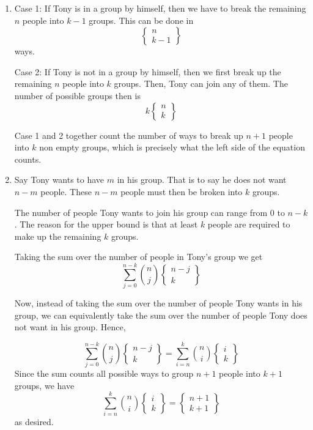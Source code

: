 \begin{enumerate}[label=(\alph*)]
\item Case 1: If Tony is in a group by himself, then we have to break the 
remaining $n$ people into $k-1$ groups. This can be done in 
  $$
  \left\{
    \begin{array}{cc}
        n\\
        k-1
    \end{array}
  \right\}
  $$
  ways.
  
  Case 2: If Tony is not in a group by himself, then we first break up the 
  remaining $n$ people into $k$ groups. Then, Tony can join any of them. 
  The number of possible groups then is
  $$
  k\left\{
    \begin{array}{cc}
        n\\
        k
    \end{array}
  \right\}
  $$
  
  Case 1 and 2 together count the number of ways to break up $n+1$ people into 
  $k$ non empty groups, which is precisely what the left side of the equation counts.

\item   Say Tony wants to have $m$ in his group. That is to say he does not want 
$n-m$ people. These $n-m$ people must then be broken into $k$ groups. 
  
  The number of people Tony wants to join his group can range from $0$ to $n-k$. 
  The reason for the upper bound is that at least $k$ people are required to 
  make up the remaining $k$ groups.
  
  Taking the sum over the number of people in Tony's group we get
  $$\sum_{j=0}^{n-k}{n \choose j}\left\{
    \begin{array}{cc}
        n-j\\
        k
    \end{array}
  \right\}
  $$
  
  Now, instead of taking the sum over the number of people Tony wants in his 
  group, we can equivalently take the sum over the number of people Tony does 
  not want in his group. Hence,
  
  $$\sum_{j=0}^{n-k}{n \choose j}\left\{
      \begin{array}{cc}
          n-j\\
          k
      \end{array}
    \right\} = \sum_{i=n}^{k}{n \choose i}\left\{
      \begin{array}{cc}
          i\\
          k
      \end{array}
    \right\}
  $$
Since the sum counts all possible ways to group $n+1$ people into $k+1$ groups, 
we have 
$$
\sum_{i=n}^{k}{n \choose i}\left\{
      \begin{array}{cc}
          i\\
          k
      \end{array}
    \right\} = 
    \left\{
      \begin{array}{cc}
          n+1\\
          k+1
      \end{array}
    \right\}
$$
as desired.

\end{enumerate}